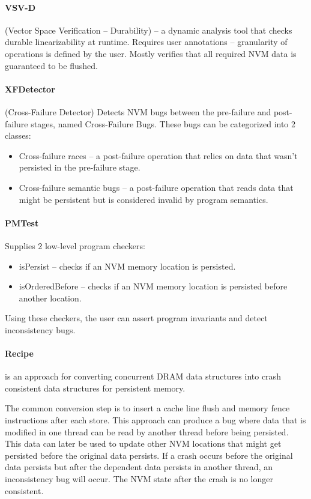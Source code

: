 \documentclass[a4paper,12pt]{article}
\begin{document}
\paragraph{VSV-D} (Vector Space Verification – Durability) \cite{Peterson21} – a dynamic analysis tool that checks durable linearizability at runtime.
Requires user annotations – granularity of operations is defined by the user.
Mostly verifies that all required NVM data is guaranteed to be flushed.

\paragraph{XFDetector} (Cross-Failure Detector) \cite{Liu20}
Detects NVM bugs between the pre-failure and post-failure stages, named Cross-Failure Bugs.
These bugs can be categorized into 2 classes:
\begin{itemize}
    \item Cross-failure races – a post-failure operation that relies on data that wasn’t persisted in the pre-failure stage.
    \item Cross-failure semantic bugs – a post-failure operation that reads data that might be persistent but is considered invalid by program semantics.
\end{itemize}

\paragraph{PMTest} \cite{Liu19}
Supplies 2 low-level program checkers:
\begin{itemize}
\item isPersist – checks if an NVM memory location is persisted.
\item isOrderedBefore – checks if an NVM memory location is persisted before another location.
\end{itemize}

Using these checkers, the user can assert program invariants and detect inconsistency bugs.

\paragraph{Recipe} \cite{Lee19} is an approach for converting concurrent DRAM data structures into crash consistent data structures for persistent memory.

The common conversion step is to insert a cache line flush and memory fence instructions after each store. 
This approach can produce a bug where data that is modified in one thread can be read by another thread before being persisted. This data can later be used to update other NVM locations that might get persisted before the original data persists. If a crash occurs before the original data persists but after the dependent data persists in another thread, an inconsistency bug will occur. The NVM state after the crash is no longer consistent.
\end{document}
